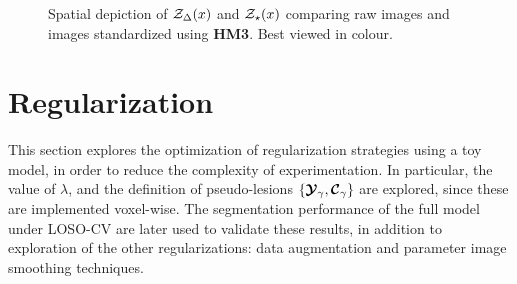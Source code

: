 \begin{figure}
 \\[0.5em]
  \\[0.5em]
  \\[0.5em]
  \\[0.5em]
  \\[0.5em]
  \caption{Spatial depiction of $\mathcal{Z}_{\Delta}(x)$ and $\mathcal{Z}_{\star}(x)$ comparing raw images 
    and images standardized using \textbf{HM3}.
  Best viewed in colour.}%
  \label{fig:jsep-diff-x-narm}
\end{figure}

\clearpage
\section{Regularization}
This section explores the optimization of regularization strategies using a toy model,
in order to reduce the complexity of experimentation.
In particular,
the value of $\lambda$,
and the definition of pseudo-lesions $\{\bm{\mathcal{Y}}_{\gamma},\bm{\mathcal{C}}_{\gamma}\}$
are explored, since these are implemented voxel-wise.
The segmentation performance of the full model under LOSO-CV
are later used to validate these results,
in addition to exploration of the other regularizations:
data augmentation and parameter image smoothing techniques.

